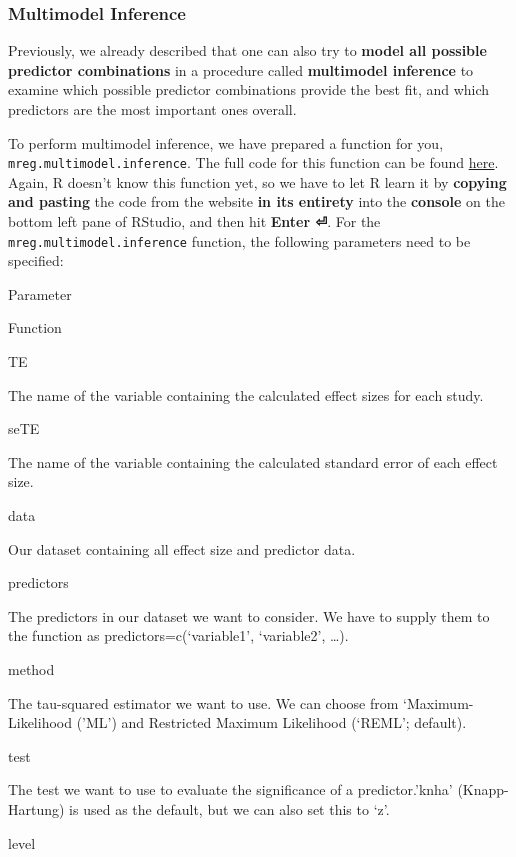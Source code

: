 \documentclass[]{book}
\begin{document}
\hypertarget{multimodel-inference}{%
\subsubsection{Multimodel Inference}\label{multimodel-inference}}

Previously, we already described that one can also try to \textbf{model all possible predictor combinations} in a procedure called \textbf{multimodel inference} to examine which possible predictor combinations provide the best fit, and which predictors are the most important ones overall.

To perform multimodel inference, we have prepared a function for you, \texttt{mreg.multimodel.inference}. The full code for this function can be found \href{https://github.com/MathiasHarrer/Doing-Meta-Analysis-in-R/blob/master/mreg.multimodel.inference.R}{here}. Again, R doesn't know this function yet, so we have to let R learn it by \textbf{copying and pasting} the code from the website \textbf{in its entirety} into the \textbf{console} on the bottom left pane of RStudio, and then hit \textbf{Enter ⏎}. For the \texttt{mreg.multimodel.inference} function, the following parameters need to be specified:

Parameter

Function

TE

The name of the variable containing the calculated effect sizes for each study.

seTE

The name of the variable containing the calculated standard error of each effect size.

data

Our dataset containing all effect size and predictor data.

predictors

The predictors in our dataset we want to consider. We have to supply them to the function as predictors=c(`variable1', `variable2', \ldots{}).

method

The tau-squared estimator we want to use. We can choose from `Maximum-Likelihood ('ML') and Restricted Maximum Likelihood (`REML'; default).

test

The test we want to use to evaluate the significance of a predictor.'knha' (Knapp-Hartung) is used as the default, but we can also set this to `z'.

level
\end{document}
